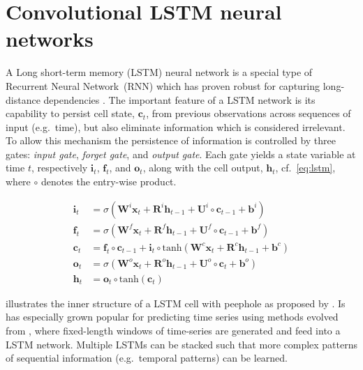 \documentclass[preprint,11pt,5p,twocolumn]{elsarticle}
\newcommand{\matr}[1]{\mathbf{#1}}
\begin{document}
\section{Convolutional LSTM neural networks}
\label{sec:convlstm}
A Long short-term memory (LSTM) neural network is a special type of Recurrent Neural Network~(RNN) which has proven robust for capturing long-distance dependencies \cite{Lstm1,Lstm2}. The important feature of a LSTM network is its capability to persist cell state, $\matr{c}_t$, from previous observations across sequences of input (e.g.\ time), but also eliminate information which is considered irrelevant. To allow this mechanism the persistence of information is controlled by three gates: \emph{input gate}, \emph{forget gate}, and \emph{output gate}. Each gate yields a state variable at time $t$, respectively $\matr{i}_t$, $\matr{f}_t$, and $\matr{o}_t$, along with the cell output, $\matr{h}_t$, cf.~\cref{eq:lstm}, where $\circ$ denotes the entry-wise product.

\begin{equation}
\begin{aligned}
  \matr{i}_t &= \sigma \left( \matr{W}^i \matr{x}_t + \matr{R}^i \matr{h}_{t-1} + \matr{U}^i \circ \matr{c}_{t-1} + \matr{b}^i \right) \\
  \matr{f}_t &= \sigma \left( \matr{W}^f \matr{x}_t + \matr{R}^f \matr{h}_{t-1} + \matr{U}^f \circ \matr{c}_{t-1} + \matr{b}^f \right) \\
  \matr{c}_t &= \matr{f}_t \circ \matr{c}_{t-1} + \matr{i}_t \circ \mathrm{tanh} \left( \matr{W}^c \matr{x}_t + \matr{R}^c \matr{h}_{t-1} + \matr{b}^c \right) \\
  \matr{o}_t &= \sigma \left( \matr{W}^\mathit{o} \matr{x}_t + \matr{R}^\mathit{o} \matr{h}_{t-1} + \matr{U}^\mathit{o} \circ \matr{c}_{t} + \matr{b}^o \right) \\
  \matr{h}_t &= \matr{o}_t \circ \mathrm{tanh} \left( \matr{c}_t \right)
\end{aligned}
\label{eq:lstm}
\end{equation}
\vspace{.5em}

 illustrates the inner structure of a LSTM cell with peephole as proposed by \cite{LstmPeephole}. 
Is has especially grown popular for predicting time series using methods evolved from \cite{LstmTs}, where fixed-length windows of time-series are generated and feed into a LSTM network. Multiple LSTMs can be stacked such that more complex patterns of sequential information (e.g.\ temporal patterns) can be learned.
\end{document}
